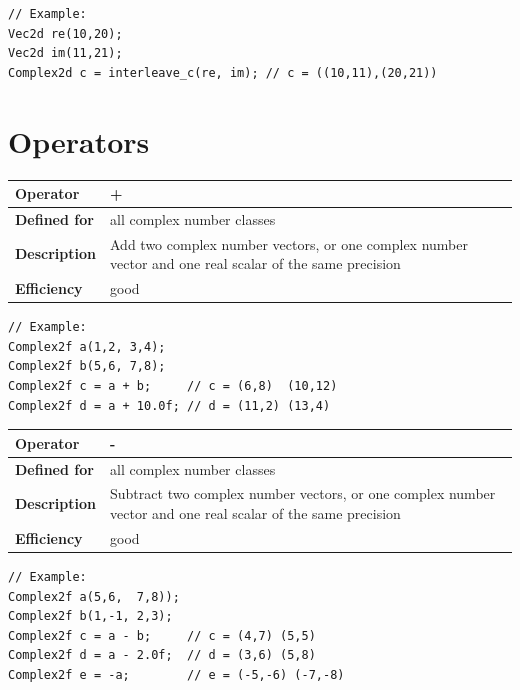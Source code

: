 \documentclass[11pt,a4paper,oneside,openright]{report}
\newcommand{\vspacesmall}{\vspace{3mm}}
\newcommand{\vspacebig}{\vspace{6mm}}
\begin{document}
\begin{lstlisting}[frame=none]
// Example:
Vec2d re(10,20);
Vec2d im(11,21);
Complex2d c = interleave_c(re, im); // c = ((10,11),(20,21))
\end{lstlisting}
\vspacebig


\chapter{Operators}\label{chap:Operators}

\begin{tabular}{|p{25mm}|p{100mm}|}
\hline
\bfseries Operator & + \\ \hline
\bfseries Defined for & all complex number classes  \\ \hline
\bfseries Description & Add two complex number vectors, or one complex number vector and one real scalar of the same precision \\ \hline
\bfseries Efficiency & good \\ \hline
\end{tabular}
\vspacesmall

\begin{lstlisting}[frame=none]
// Example:
Complex2f a(1,2, 3,4);
Complex2f b(5,6, 7,8);
Complex2f c = a + b;     // c = (6,8)  (10,12)
Complex2f d = a + 10.0f; // d = (11,2) (13,4)
\end{lstlisting}
\vspacebig


\begin{tabular}{|p{25mm}|p{100mm}|}
\hline
\bfseries Operator & - \\ \hline
\bfseries Defined for & all complex number classes  \\ \hline
\bfseries Description & Subtract two complex number vectors, or one complex number vector and one real scalar of the same precision \\ \hline
\bfseries Efficiency & good \\ \hline
\end{tabular}
\vspacesmall

\begin{lstlisting}[frame=none]
// Example:
Complex2f a(5,6,  7,8));
Complex2f b(1,-1, 2,3);
Complex2f c = a - b;     // c = (4,7) (5,5)
Complex2f d = a - 2.0f;  // d = (3,6) (5,8)
Complex2f e = -a;        // e = (-5,-6) (-7,-8)
\end{lstlisting}
\vspacebig
\end{document}
